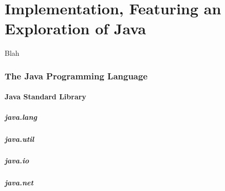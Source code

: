 
\part*{Implementation, Featuring an Exploration of Java}


Blah \\


\toclineskip
\section{The Java Programming Language}


\subsection{Java Standard Library}

\subsubsection{java.lang}

\subsubsection{java.util}

\subsubsection{java.io}

\subsubsection{java.net}

